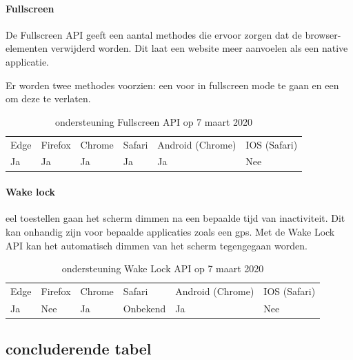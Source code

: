 \paragraph{Fullscreen }
De Fullscreen API \autocite{Kesteren2014} geeft een aantal methodes die ervoor zorgen dat de browser-elementen verwijderd worden. Dit laat een website meer aanvoelen als een native applicatie.

Er worden twee methodes voorzien: een voor in fullscreen mode te gaan en een om deze te verlaten.

\begin{table}[H]
	\begin{tabular}{llllll}
		Edge & Firefox & Chrome & Safari & Android (Chrome) & IOS (Safari) \\
		Ja   & Ja      &  Ja   & Ja     & Ja               & Nee          
	\end{tabular}	
	\caption{ondersteuning  Fullscreen API op 7 maart 2020 }
\end{table}


\paragraph{Wake lock }
eel toestellen gaan het scherm dimmen na een bepaalde tijd van inactiviteit. Dit kan onhandig zijn voor bepaalde applicaties zoals een gps. Met de Wake Lock API \autocite{Bogdanovich2017} kan het automatisch dimmen van het scherm tegengegaan worden.

\begin{table}[H]
	\centering
	\begin{tabular}{llllll}
		Edge & Firefox & Chrome & Safari & Android (Chrome) & IOS (Safari) \\
		Ja   & Nee      &  Ja   & Onbekend     & Ja               & Nee          
	\end{tabular}	
	\caption{ondersteuning  Wake Lock API op 7 maart 2020 }
\end{table}

\subsection{concluderende tabel}

